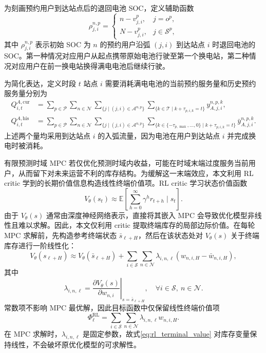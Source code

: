 \documentclass[12pt,hyperref,a4paper,UTF8]{ctexart}
\begin{document}
为刻画预约用户到达站点后的退回电池 SOC，定义辅助函数
\begin{equation}
\rho_{j,i}^{n,p}=
\begin{cases}
 n-v_{j,i}^{p}, & j=o^p,\\
 N-v_{j,i}^{p}, & j\in\mathcal{S}^{p},
\end{cases}
\label{eq:return_soc}
\end{equation}
其中 $\rho_{j,i}^{n,p}$ 表示初始 SOC 为 $n$ 的预约用户沿弧 $(j,i)$ 到达站点 $i$ 时退回电池的 SOC。第一种情况对应用户从起点携带原始电池行驶至第一个换电站，第二种情况对应用户在前一换电站换得满电电池后继续行驶。

为简化表达，定义时段 $t$ 站点 $i$ 需要消耗满电电池的当前预约服务量和历史预约服务量分别为
\begin{align}
Q_{i,t}^{A,\mathrm{cur}}
&=
\sum_{p\in\mathcal{P}}
\sum_{n\in\mathcal{N}}
\sum_{\{j\mid (j,i)\in\mathcal{A}^{n,p}\}}
\sum_{\{k\in\mathcal{T}\mid k+\tau_{p,i,k}=t\}}
y_{A,j,i}^{n,p,k},
\label{eq:current_reservation_swap}\\
Q_{i,t}^{A,\mathrm{his}}
&=
\sum_{p\in\mathcal{P}}
\sum_{n\in\mathcal{N}}
\sum_{\{j\mid (j,i)\in\mathcal{A}^{n,p}\}}
\sum_{\{k\in\{-\tau_{p,\max},\ldots,0\}\mid k+\tau_{p,i,k}=t\}}
\bar{y}_{A,j,i}^{n,p,k}.
\label{eq:historical_reservation_swap}
\end{align}
上述两个量均采用到达站点 $i$ 的入弧流量，因为电池在用户到达站点 $i$ 并完成换电时被消耗。

有限预测时域 MPC 若仅优化预测时域内收益，可能在时域末端过度服务当前用户，从而留下对未来运营不利的库存结构。为缓解这一末端效应，本文利用 RL critic 学到的长期价值信息构造线性终端价值项。RL critic 学习状态价值函数
\begin{equation}
V_{\theta}(s_t)\approx
\mathbb{E}\left[\sum_{h=0}^{\infty}\gamma^h r_{t+h}\mid s_t\right].
\label{eq:critic_value}
\end{equation}
由于 $V_{\theta}(s)$ 通常由深度神经网络表示，直接将其嵌入 MPC 会导致优化模型非线性且难以求解。因此，本文仅利用 critic 提取终端库存的局部边际价值。在每轮 MPC 求解前，先构造参考终端状态 $\bar{s}_{\ell+H}$，然后在该状态处对 $V_{\theta}(s)$ 关于终端库存进行一阶线性化：
\begin{equation}
V_{\theta}(s_{\ell+H})
\approx
V_{\theta}(\bar{s}_{\ell+H})+
\sum_{i\in\mathcal{S}}\sum_{n\in\mathcal{N}}
\lambda_{i,n,\ell}\left(w_{n,i,H}-\bar{w}_{n,i,H}\right),
\label{eq:value_linearization}
\end{equation}
其中
\begin{equation}
\lambda_{i,n,\ell}
=
\left.
\frac{\partial V_{\theta}(s)}{\partial w_{n,i}}
\right|_{s=\bar{s}_{\ell+H}},
\quad \forall i\in\mathcal{S},\ n\in\mathcal{N}.
\label{eq:marginal_value}
\end{equation}
常数项不影响 MPC 最优解，因此目标函数中仅保留线性终端价值项
\begin{equation}
\Phi^{\mathrm{RL}}_{\ell}
=
\sum_{i\in\mathcal{S}}\sum_{n\in\mathcal{N}}
\lambda_{i,n,\ell}w_{n,i,H}.
\label{eq:rl_terminal_value}
\end{equation}
在 MPC 求解时，$\lambda_{i,n,\ell}$ 是固定参数，故式\eqref{eq:rl_terminal_value} 对库存变量保持线性，不会破坏原优化模型的可求解性。
\end{document}
